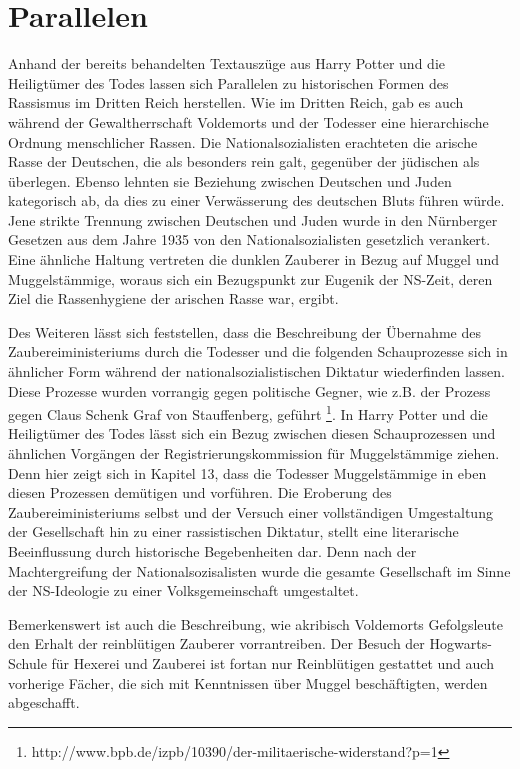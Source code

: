 \section {Parallelen}
Anhand der bereits behandelten Textauszüge aus \glqq Harry Potter und die Heiligtümer des Todes\grqq{} lassen sich Parallelen zu historischen Formen des Rassismus im Dritten Reich herstellen.
Wie im Dritten Reich, gab es auch während der Gewaltherrschaft Voldemorts und der Todesser eine hierarchische Ordnung menschlicher \glqq Rassen\grqq. 
Die Nationalsozialisten erachteten die \glqq arische\grqq{} Rasse der Deutschen, die als besonders rein galt, gegenüber der \glqq jüdischen\grqq{} als überlegen. 
Ebenso lehnten sie Beziehung zwischen Deutschen und Juden kategorisch ab, da dies zu einer Verwässerung des \glqq deutschen\grqq{} Bluts führen würde.
Jene strikte Trennung zwischen Deutschen und Juden wurde in den \glqq Nürnberger Gesetzen\grqq{} aus dem Jahre 1935 von den Nationalsozialisten gesetzlich verankert\cite[S.\,72]{MW121}.
Eine ähnliche Haltung vertreten die dunklen Zauberer in Bezug auf Muggel und Muggelstämmige, woraus sich ein Bezugspunkt zur Eugenik der NS-Zeit, deren Ziel die \glqq Rassenhygiene\grqq{} der \glqq arischen\grqq{} Rasse war, ergibt.

Des Weiteren lässt sich feststellen, dass die Beschreibung der Übernahme des Zaubereiministeriums durch die Todesser und die folgenden \glqq Schauprozesse\grqq{} sich in ähnlicher Form während der nationalsozialistischen Diktatur wiederfinden lassen.
Diese Prozesse wurden vorrangig gegen politische Gegner, wie z.B. der Prozess gegen Claus Schenk Graf von Stauffenberg, geführt \footnote{http://www.bpb.de/izpb/10390/der-militaerische-widerstand?p=1}. 
In \glqq Harry Potter und die Heiligtümer des Todes\grqq{} lässt sich ein Bezug zwischen diesen Schauprozessen und ähnlichen Vorgängen der \glqq Registrierungskommission für Muggelstämmige\grqq{} ziehen. 
Denn hier zeigt sich in Kapitel 13, dass die Todesser Muggelstämmige in eben diesen Prozessen demütigen und vorführen.
Die Eroberung des Zaubereiministeriums selbst und der Versuch einer  vollständigen Umgestaltung der Gesellschaft hin zu einer rassistischen Diktatur, stellt eine literarische Beeinflussung durch historische Begebenheiten dar.
Denn nach der \glqq Machtergreifung\grqq{} der Nationalsozisalisten wurde die gesamte Gesellschaft im Sinne der NS-Ideologie zu einer \glqq Volksgemeinschaft\grqq{} umgestaltet. 

Bemerkenswert ist auch die Beschreibung, wie akribisch Voldemorts Gefolgsleute den \glqq Erhalt\grqq{} der reinblütigen Zauberer vorrantreiben.
Der Besuch der Hogwarts-Schule für Hexerei und Zauberei ist fortan nur Reinblütigen gestattet und auch vorherige Fächer, die sich mit Kenntnissen über Muggel beschäftigten, werden abgeschafft. 

